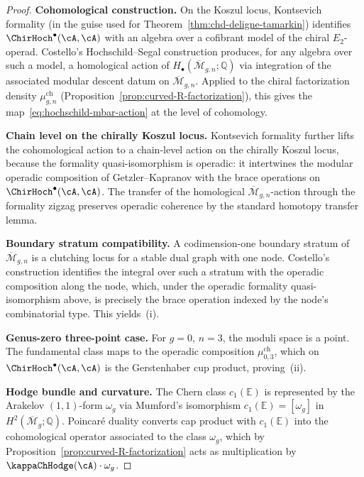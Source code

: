 \begin{proof}
\textbf{Cohomological construction.}
On the Koszul locus, Kontsevich formality (in the guise used for
Theorem~\textup{\ref{thm:chd-deligne-tamarkin}}) identifies
$\ChirHoch^\bullet(\cA,\cA)$ with an algebra over a cofibrant model
of the chiral $E_2$-operad. Costello's Hochschild--Segal construction
produces, for any algebra over such a model, a homological action of
$H_\bullet(\overline{\mathcal{M}}_{g,n};\mathbb{Q})$ via integration
of the associated modular descent datum on
$\overline{\mathcal{M}}_{g,n}$. Applied to the chiral factorization
density $\mu^{\mathrm{ch}}_{g,n}$
(Proposition~\textup{\ref{prop:curved-R-factorization}}), this gives
the map~\eqref{eq:hochschild-mbar-action} at the level of cohomology.

\textbf{Chain level on the chirally Koszul locus.}
Kontsevich formality further lifts the cohomological action to a
chain-level action on the chirally Koszul locus, because the formality
quasi-isomorphism is operadic: it intertwines the modular operadic
composition of Getzler--Kapranov with the brace operations on
$\ChirHoch^\bullet(\cA,\cA)$. The transfer of the homological
$\overline{\mathcal{M}}_{g,n}$-action through the formality zigzag
preserves operadic coherence by the standard homotopy transfer lemma.

\textbf{Boundary stratum compatibility.}
A codimension-one boundary stratum of $\overline{\mathcal{M}}_{g,n}$
is a clutching locus for a stable dual graph with one node.
Costello's construction identifies the integral over such a stratum
with the operadic composition along the node, which, under the
operadic formality quasi-isomorphism above, is precisely the brace operation
indexed by the node's combinatorial type. This yields~(i).

\textbf{Genus-zero three-point case.}
For $g=0$, $n=3$, the moduli space is a point. The fundamental class
maps to the operadic composition $\mu^{\mathrm{ch}}_{0,3}$, which on
$\ChirHoch^\bullet(\cA,\cA)$ is the Gerstenhaber cup product, proving~(ii).

\textbf{Hodge bundle and curvature.}
The Chern class $c_1(\mathbb{E})$ is represented by the Arakelov
$(1,1)$-form $\omega_g$ via Mumford's isomorphism
$c_1(\mathbb{E}) = [\omega_g]$ in $H^2(\overline{\mathcal{M}}_g;\mathbb{Q})$.
Poincar\'e duality converts cap product with $c_1(\mathbb{E})$ into
the cohomological operator associated to the class
$\omega_g$, which by
Proposition~\textup{\ref{prop:curved-R-factorization}} acts as
multiplication by $\kappaChHodge(\cA)\cdot\omega_g$.
\end{proof}


